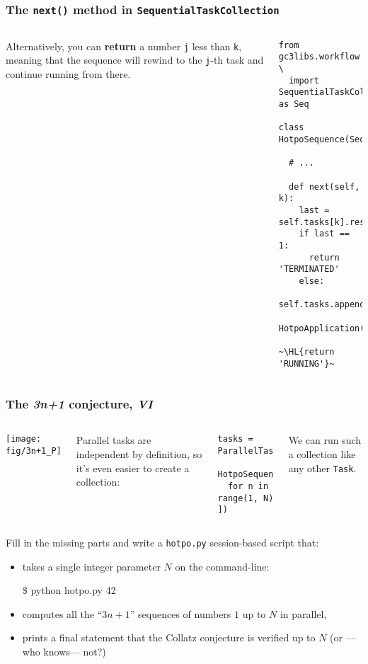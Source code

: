 \documentclass[english,serif,mathserif,xcolor=pdftex,dvipsnames,table]{beamer}
\begin{document}
\begin{frame}[fragile]
  \frametitle{The \texttt{next()} method in \texttt{SequentialTaskCollection}}
  \label{sec:14}

  \begin{columns}
    Alternatively, you can \textbf{return} a number \texttt{j} less than \texttt{k},
    meaning that the sequence will rewind to the \texttt{j}-th task and continue
    running from there.

    \begin{lstlisting}[basicstyle=\ttfamily\footnotesize]
from gc3libs.workflow \
  import SequentialTaskCollection as Seq

class HotpoSequence(Seq):

  # ...

  def next(self, k):
    last = self.tasks[k].result
    if last == 1:
      return 'TERMINATED'
    else:
      self.tasks.append(
        HotpoApplication(last))
      ~\HL{return 'RUNNING'}~
    \end{lstlisting}
  \end{columns}
\end{frame}


\begin{frame}[fragile]
  \frametitle{The \emph{3n+1} conjecture, \emph{VI}}
  \label{sec:15}

  \begin{columns}
    \begin{center}
      \texttt{[image: fig/3n+1\_P]}
    \end{center}

    \small
    Parallel tasks are independent by definition, so it's even easier to
    create a collection:
    \begin{lstlisting}
tasks = ParallelTaskCollection([
  HotpoSequence(n)
  for n in range(1, N)
])
    \end{lstlisting}

    We can run such a collection like any other \texttt{Task}.
  \end{columns}
\end{frame}


\begin{frame}[fragile]
  \begin{exercise*}[11.A]

    \+
    Fill in the missing parts and write a \texttt{hotpo.py} session-based script that:
    \begin{itemize}
    \item takes a single integer parameter $N$ on the command-line:
      \begin{semiverbatim}
\$ python hotpo.py 42
      \end{semiverbatim}
    \item computes all the ``$3n+1$'' sequences of numbers $1$ up to $N$ in parallel,
    \item prints a final statement that the Collatz conjecture is verified up to $N$ (or ---who knows--- not?)
    \end{itemize}
  \end{exercise*}
\end{frame}
\end{document}
